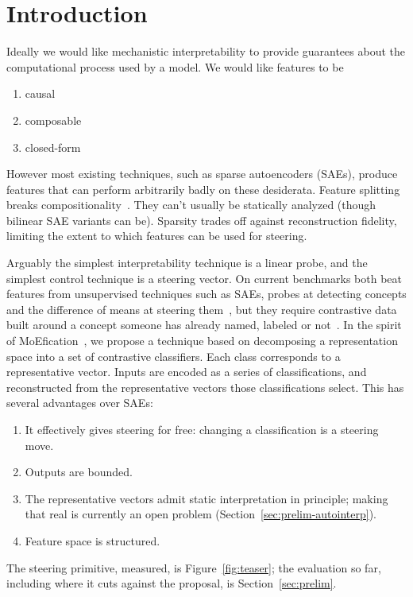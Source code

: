 \section{Introduction}

Ideally we would like mechanistic interpretability to provide guarantees
about the computational process used by a model. We would like features
to be
\begin{enumerate}
	\item causal
	\item composable
	\item closed-form
\end{enumerate}
However most existing techniques, such as sparse autoencoders (SAEs),
produce features that can perform arbitrarily badly on these desiderata.
Feature splitting breaks compositionality~\cite{bricken2023,chanin2025}. They can't usually be
statically analyzed (though bilinear SAE variants can be). Sparsity
trades off against reconstruction fidelity, limiting the extent to which
features can be used for steering.

Arguably the simplest interpretability technique is a linear probe, and
the simplest control technique is a steering vector. On current
benchmarks both beat features from unsupervised techniques such as SAEs,
probes at detecting concepts and the difference of means at steering
them~\cite{wu2025axbenchsteeringllmssimple}, but they require contrastive
data built around a concept someone has already named, labeled or
not~\cite{burns2023ccs}. In the spirit of MoEfication~\cite{zhang2022}, we
propose a technique based on decomposing a representation space into a
set of contrastive classifiers. Each class corresponds to a representative vector. Inputs
are encoded as a series of classifications, and reconstructed from the
representative vectors those classifications select. This has several
advantages over SAEs:
\begin{enumerate}
	\item It effectively gives steering for free: changing a
	classification is a steering move.
	\item Outputs are bounded.
	\item The representative vectors admit static interpretation in
	principle; making that real is currently an open problem
	(Section~\ref{sec:prelim-autointerp}).
	\item Feature space is structured.
\end{enumerate}
The steering primitive, measured, is Figure~\ref{fig:teaser}; the
evaluation so far, including where it cuts against the proposal, is
Section~\ref{sec:prelim}.

